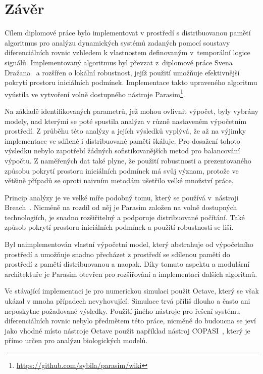 \chapter{Závěr}\label{chapter:conclusion}

Cílem diplomové práce bylo implementovat v prostředí s distribuovanou pamětí
algoritmus pro analýzu dynamických systémů zadaných pomocí
soustavy diferenciálních rovnic vzhledem k vlastnostem definovaným
v~tem\-po\-rál\-ní logice signálů. Implementovaný algoritmus byl
převzat z~diplomové práce Svena Dražana~\cite{drazan2011} a rozšířen o lokální robustnost, jejíž použití umožňuje
efektivnější pokrytí prostoru iniciálních pod\-mí\-nek. 
Implementace takto upraveného algoritmu vyústila ve vytvoření volně dostupného nástroje Parasim\footnote{\url{https://github.com/sybila/parasim/wiki}}.

Na základě identifikovaných parametrů, jež mohou ovlivnit výpočet, byly vybrány modely,
nad kterými se poté spustila analýza v různě nastaveném výpočetním prostředí.
Z průběhu této analýzy a jejích výsledků vyplývá, že až na výjimky implementace
ve sdílené i distribuované paměti škáluje. Pro dosažení tohoto výsledku nebylo zapotřebí
žádných sofistikovanějších metod pro balancování výpočtu. Z naměřených
dat také plyne, že použití robustnosti a prezentovaného způsobu pokrytí prostoru iniciálních podmínek má svůj význam,
protože ve většině případů se oproti naivním metodám ušetřilo velké množství práce.

Princip analýzy je ve velké míře podobný tomu, který se používá v~nás\-tro\-ji Breach~\cite{donze2010breach}.
Nicméně na rozdíl od něj je Parasim založen na volně dostupných technologiích, je snadno rozšiřitelný
a podporuje distribuované počítání. Také způsob pokrytí prostoru iniciálních podmínek
a použití robustnosti se liší.

Byl naimplementován vlastní výpočetní model, který abstrahuje od vý\-po\-čet\-ního
prostředí a umožňuje snadno přecházet z prostředí se sdí\-le\-nou pamětí do prostředí z pamětí distribuovanou
a naopak. Díky tomuto a\-spek\-tu a modulární architektuře je Parasim otevřen pro rozšiřování a
implementaci dalších algoritmů.

Ve stávající implementaci je pro numerickou simulaci použit Octave, který se
však ukázal v mnoha případech nevyhovující. Simulace trvá příliš dlouho a často ani
neposkytne požadované výsledky. Použití jiného nástroje pro řešení systému
diferenciálních rovnic nebylo předmětem této práce, nicméně do budoucna se jeví jako vhodné
místo nástroje Octave použít například nástroj COPASI~\cite{hoops2006}, který je přímo určen
pro analýzu biologických modelů.
